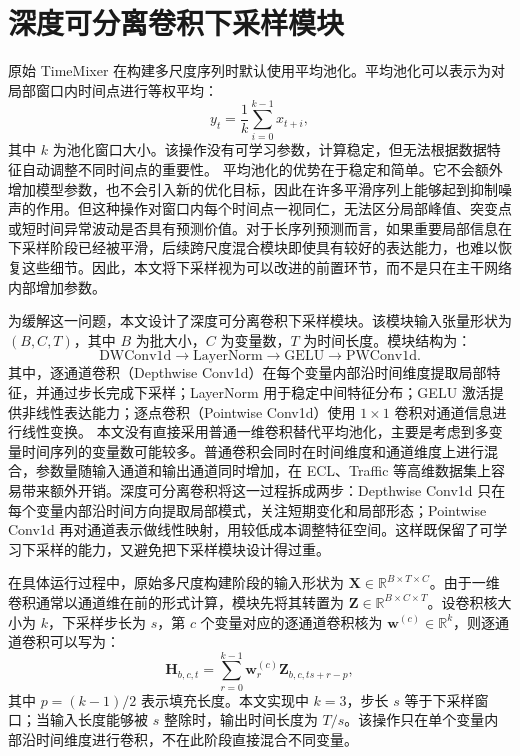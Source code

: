 \section{深度可分离卷积下采样模块}

原始 TimeMixer 在构建多尺度序列时默认使用平均池化。平均池化可以表示为对局部窗口内时间点进行等权平均：
\begin{equation}
    y_t = \frac{1}{k}\sum_{i=0}^{k-1} x_{t+i},
\end{equation}
其中 $k$ 为池化窗口大小。该操作没有可学习参数，计算稳定，但无法根据数据特征自动调整不同时间点的重要性。
平均池化的优势在于稳定和简单。它不会额外增加模型参数，也不会引入新的优化目标，因此在许多平滑序列上能够起到抑制噪声的作用。但这种操作对窗口内每个时间点一视同仁，无法区分局部峰值、突变点或短时间异常波动是否具有预测价值。对于长序列预测而言，如果重要局部信息在下采样阶段已经被平滑，后续跨尺度混合模块即使具有较好的表达能力，也难以恢复这些细节。因此，本文将下采样视为可以改进的前置环节，而不是只在主干网络内部增加参数。

为缓解这一问题，本文设计了深度可分离卷积下采样模块。该模块输入张量形状为 $(B,C,T)$，其中 $B$ 为批大小，$C$ 为变量数，$T$ 为时间长度。模块结构为：
\begin{equation}
    \mathrm{DWConv1d} \rightarrow \mathrm{LayerNorm} \rightarrow \mathrm{GELU} \rightarrow \mathrm{PWConv1d}.
\end{equation}
其中，逐通道卷积（Depthwise Conv1d）在每个变量内部沿时间维度提取局部特征，并通过步长完成下采样；LayerNorm 用于稳定中间特征分布；GELU 激活提供非线性表达能力；逐点卷积（Pointwise Conv1d）使用 $1 \times 1$ 卷积对通道信息进行线性变换。
本文没有直接采用普通一维卷积替代平均池化，主要是考虑到多变量时间序列的变量数可能较多。普通卷积会同时在时间维度和通道维度上进行混合，参数量随输入通道和输出通道同时增加，在 ECL、Traffic 等高维数据集上容易带来额外开销。深度可分离卷积将这一过程拆成两步：Depthwise Conv1d 只在每个变量内部沿时间方向提取局部模式，关注短期变化和局部形态；Pointwise Conv1d 再对通道表示做线性映射，用较低成本调整特征空间。这样既保留了可学习下采样的能力，又避免把下采样模块设计得过重。

在具体运行过程中，原始多尺度构建阶段的输入形状为 $\mathbf{X}\in\mathbb{R}^{B\times T\times C}$。由于一维卷积通常以通道维在前的形式计算，模块先将其转置为 $\mathbf{Z}\in\mathbb{R}^{B\times C\times T}$。设卷积核大小为 $k$，下采样步长为 $s$，第 $c$ 个变量对应的逐通道卷积核为 $\mathbf{w}^{(c)}\in\mathbb{R}^{k}$，则逐通道卷积可以写为：
\begin{equation}
    \mathbf{H}_{b,c,t}=\sum_{r=0}^{k-1}\mathbf{w}_{r}^{(c)}\mathbf{Z}_{b,c,ts+r-p},
\end{equation}
其中 $p=(k-1)/2$ 表示填充长度。本文实现中 $k=3$，步长 $s$ 等于下采样窗口；当输入长度能够被 $s$ 整除时，输出时间长度为 $T/s$。该操作只在单个变量内部沿时间维度进行卷积，不在此阶段直接混合不同变量。

